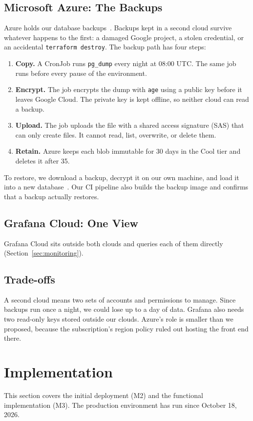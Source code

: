 \documentclass[conference]{IEEEtran}
\begin{document}
\subsection{Microsoft Azure: The Backups}
Azure holds our database backups~\cite{adr4}. Backups kept in a second
cloud survive whatever happens to the first: a damaged Google project, a
stolen credential, or an accidental \texttt{terraform destroy}. The backup
path has four steps:
\begin{enumerate}
\item \textbf{Copy.} A CronJob runs \texttt{pg\_dump} every night at 08:00
UTC. The same job runs before every pause of the environment.
\item \textbf{Encrypt.} The job encrypts the dump with \texttt{age} using a
public key before it leaves Google Cloud. The private key is kept offline,
so neither cloud can read a backup.
\item \textbf{Upload.} The job uploads the file with a shared access
signature (SAS) that can only create files. It cannot read, list,
overwrite, or delete them.
\item \textbf{Retain.} Azure keeps each blob immutable for 30 days in the
Cool tier and deletes it after 35.
\end{enumerate}
To restore, we download a backup, decrypt it on our own machine, and load
it into a new database~\cite{restore}. Our CI pipeline also builds the
backup image and confirms that a backup actually restores.

\subsection{Grafana Cloud: One View}
Grafana Cloud sits outside both clouds and queries each of them directly
(Section~\ref{sec:monitoring}).

\subsection{Trade-offs}
A second cloud means two sets of accounts and permissions to manage. Since
backups run once a night, we could lose up to a day of data. Grafana also
needs two read-only keys stored outside our clouds. Azure's role is smaller
than we proposed, because the subscription's region policy ruled out
hosting the front end there.

\section{Implementation}
\label{sec:impl}
This section covers the initial deployment (M2) and the functional
implementation (M3). The production environment has run since October 18,
2026.
\end{document}
